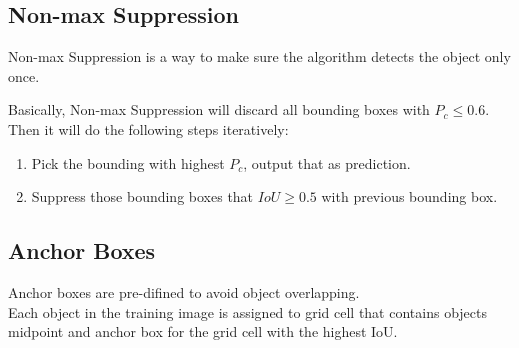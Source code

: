\documentclass{article}
\begin{document}
	\subsection{Non-max Suppression}
		\begin{flushleft}
			Non-max Suppression is a way to make sure the algorithm detects the object only once.
		\end{flushleft}
		\begin{flushleft}
			Basically, Non-max Suppression will discard all bounding boxes with $P_c \leq 0.6$.\\
			Then it will do the following steps iteratively:
			\begin{enumerate}
				\item Pick the bounding with highest $P_c$, output that as prediction.
				\item Suppress those bounding boxes that $IoU \geq 0.5$ with previous bounding box.
			\end{enumerate}
		\end{flushleft}
	\subsection{Anchor Boxes}
		\begin{flushleft}
			Anchor boxes are pre-difined to avoid object overlapping.\\
			Each object in the training image is assigned to grid cell that contains objects midpoint and anchor box for the grid cell with the highest IoU.
		\end{flushleft}
\end{document}
